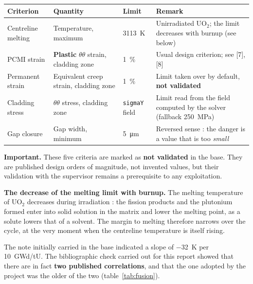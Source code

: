 \noindent
\begin{tabularx}{\textwidth}{@{}>{\raggedright\arraybackslash}p{3.3cm}
                                >{\raggedright\arraybackslash}p{2.2cm}
                                >{\raggedright\arraybackslash}p{1.9cm}
                                X@{}}
\toprule
\textbf{Criterion} & \textbf{Quantity} & \textbf{Limit} & \textbf{Remark}\\
\midrule
Centreline melting & Temperature, maximum & \SI{3113}{\kelvin} &
  Unirradiated $\mathrm{UO_2}$; the limit decreases with burnup (see
  below)\\
PCMI strain & \textbf{Plastic} $\theta\theta$ strain, cladding zone &
  \SI{1}{\percent} & Usual design criterion; see [7], [8]\\
Permanent strain & Equivalent creep strain, cladding zone &
  \SI{1}{\percent} & Limit taken over by default, \textbf{not validated}\\
Cladding stress & $\theta\theta$ stress, cladding zone &
  \texttt{sigmaY} field & Limit read from the field computed by the solver
  (fallback \SI{250}{\mega\pascal})\\
Gap closure & Gap width, minimum & \SI{5}{\micro\metre} &
  Reversed sense : the danger is a value that is too \emph{small}\\
\bottomrule
\end{tabularx}

\vspace{0.4cm}
\noindent
\textcolor{cAlert}{\textbf{Important.}} These five criteria are marked as
\textbf{not validated} in the base. They are published design orders of
magnitude, not invented values, but their validation with the supervisor remains
a prerequisite to any exploitation.

\vspace{0.4cm}
\noindent
\textbf{The decrease of the melting limit with burnup.} The melting temperature
of $\mathrm{UO_2}$ decreases during irradiation : the fission products and the
plutonium formed enter into solid solution in the matrix and lower the melting
point, as a solute lowers that of a solvent. The margin to melting therefore
narrows over the cycle, at the very moment when the centreline temperature is
itself rising.

The note initially carried in the base indicated a slope of \SI{-32}{\kelvin}
per \num{10}~GWd/tU. The bibliographic check carried out for this report showed
that there are in fact \textbf{two published correlations}, and that the one
adopted by the project was the older of the two (table~\ref{tab:fusion}).


